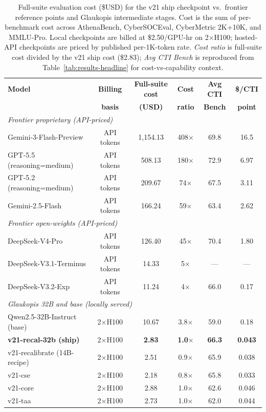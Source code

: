\documentclass[webpdf,contemporary,large]{oup-authoring-template}
\theoremstyle{thmstyleone}
\theoremstyle{thmstyletwo}
\theoremstyle{thmstylethree}
\begin{document}
\begin{table}[t]
\centering
\caption{Full-suite evaluation cost (\$USD) for the v21 ship checkpoint vs.\ frontier reference points and Glaukopis intermediate stages. Cost is the sum of per-benchmark cost across AthenaBench, CyberSOCEval, CyberMetric 2K+10K, and MMLU-Pro. Local checkpoints are billed at \$2.50/GPU-hr on 2$\times$H100; hosted-API checkpoints are priced by published per-1K-token rate. \emph{Cost ratio} is full-suite cost divided by the v21 ship cost (\$2.83); \emph{Avg CTI Bench} is reproduced from Table~\ref{tab:results-headline} for cost-vs-capability context.}
\label{tab:results-cost}
\small
\setlength{\tabcolsep}{4pt}
\begin{tabular}{lccccc}
\hline
\textbf{Model} & \textbf{Billing} & \textbf{Full-suite cost} & \textbf{Cost} & \textbf{Avg CTI} & \textbf{\$/CTI} \\
               & \textbf{basis}   & \textbf{(USD)}            & \textbf{ratio} & \textbf{Bench} & \textbf{point} \\
\hline
\multicolumn{6}{l}{\textit{Frontier proprietary (API-priced)}} \\
Gemini-3-Flash-Preview            & API tokens & 1{,}154.13 & 408$\times$ & 69.8 & 16.5 \\
GPT-5.5 (reasoning=medium)        & API tokens &    508.13 & 180$\times$ & 72.9 &  6.97 \\
GPT-5.2 (reasoning=medium)        & API tokens &    209.67 &  74$\times$ & 67.5 &  3.11 \\
Gemini-2.5-Flash                  & API tokens &    166.24 &  59$\times$ & 63.4 &  2.62 \\
\multicolumn{6}{l}{\textit{Frontier open-weights (API-priced)}} \\
DeepSeek-V4-Pro                   & API tokens &    126.40 &  45$\times$ & 70.4 &  1.80 \\
DeepSeek-V3.1-Terminus            & API tokens &     14.33 &   5$\times$ & --- & --- \\
DeepSeek-V3.2-Exp                 & API tokens &     11.24 &   4$\times$ & 66.0 &  0.17 \\
\multicolumn{6}{l}{\textit{Glaukopis 32B and base (locally served)}} \\
Qwen2.5-32B-Instruct (base)       & 2$\times$H100 &    10.67 & 3.8$\times$ & 59.0 & 0.18 \\
\textbf{v21-recal-32b (ship)}     & 2$\times$H100 & \textbf{2.83} & \textbf{1.0$\times$} & \textbf{66.3} & \textbf{0.043} \\
v21-recalibrate (14B-recipe)      & 2$\times$H100 &     2.51 & 0.9$\times$ & 65.9 & 0.038 \\
v21-cse                           & 2$\times$H100 &     2.18 & 0.8$\times$ & 65.8 & 0.033 \\
v21-core                          & 2$\times$H100 &     2.88 & 1.0$\times$ & 62.6 & 0.046 \\
v21-taa                           & 2$\times$H100 &     2.73 & 1.0$\times$ & 62.0 & 0.044 \\
\hline
\end{tabular}
\end{table}
\end{document}
